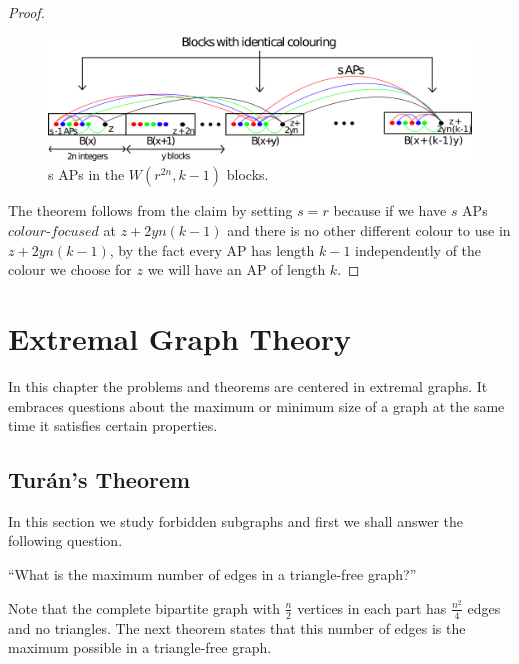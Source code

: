 \documentclass[12pt,twoside,a4paper,bibliography=totocnumbered]{book}
\numberwithin{equation}{section}
\theoremstyle{remark}
\begin{document}
\begin{proof}
\begin{figure}[H]
     \centering
     \includegraphics[scale=0.38]{Figuras/Van-der-Waerden-Blocks.png}
     \caption{s APs in the $W(r^{2n},k-1)$ blocks.}
     \label{fig:VanderWaerdenBlocks}
\end{figure}

The theorem follows from the claim by setting $s=r$ because if we have $s$  APs $\textit{colour-focused}$ at $z+2yn(k-1)$ and there is no other different colour to use in $z+2yn(k-1)$, by the fact every AP has length $k-1$  independently of the colour we choose for $z$ we will have an AP of length $k$.
\end{proof}



\chapter{Extremal Graph Theory}
In this chapter the problems and theorems are centered in extremal graphs. It embraces questions about the maximum or minimum size of a graph at the same time it satisfies certain properties.

\section{Turán's Theorem}
In this section we study forbidden subgraphs and first we shall answer the following question. 
\begin{center}``What is the maximum number of edges in a triangle-free graph?''\end{center}

Note that the complete bipartite graph with $\frac{n}{2}$ vertices in each part has $\frac{n^{2}}{4}$ edges and no triangles. The next theorem states that this number of edges is the maximum possible in a triangle-free graph.\\
\end{document}
